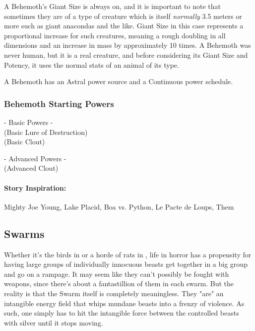 A Behemoth's Giant Size is always on, and it is important to note that sometimes they are of a type of creature which is itself \textit{normally} 3.5 meters or more such as giant anacondas and the like. Giant Size in this case represents a proportional increase for such creatures, meaning a rough doubling in all dimensions and an increase in mass by approximately 10 times. A Behemoth was never human, but it is a real creature, and before considering its Giant Size and Potency, it uses the normal stats of an animal of its type.

A Behemoth has an Astral power source and a Continuous power schedule.

\subsubsection{Behemoth Starting Powers}

\hspace{\parindent} - Basic Powers -\\
 (Basic Lure of Destruction)\\
 (Basic Clout)

- Advanced Powers -\\
 (Advanced Clout)

\paragraph{Story Inspiration:} Mighty Joe Young, Lake Placid, Boa vs. Python, Le Pacte de Loups, Them

\subsection{Swarms} 

Whether it's the birds in  or a horde of rats in , life in horror has a propensity for having large groups of individually innocuous beasts get together in a big group and go on a rampage. It may seem like they can't possibly be fought with weapons, since there's about a fantastillion of them in each swarm. But the reality is that the Swarm itself is completely meaningless. They "are" an intangible energy field that whips mundane beasts into a frenzy of violence. As such, one simply has to hit the intangible force between the controlled beasts with silver until it stops moving.

